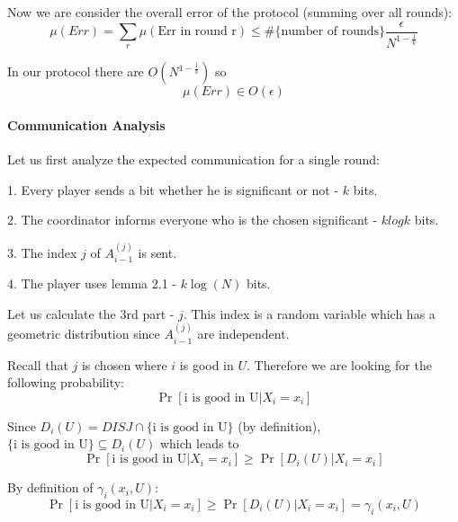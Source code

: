 \documentclass{article}
\theoremstyle{plain}
\begin{document}
Now we are consider the overall error of the protocol (summing over all rounds):
\begin{equation*}
  \mu(Err) = \sum_{r} \mu(\text{Err in round r}) \leq \#\{\text{number of rounds}\} \frac{\epsilon}{N^{1-\frac{1}{k}}}
\end{equation*}

In our protocol there are $O(N^{1-\frac{1}{k}})$ so
\begin{equation*}
  \mu(Err) \in O(\epsilon)
\end{equation*}

\paragraph{Communication Analysis}
Let us first analyze the expected communication for a single round: \newline

1. Every player sends a bit whether he is significant or not - $k$ bits.\newline

2. The coordinator informs everyone who is the chosen significant - $klogk$ bits. \newline

3. The index $j$ of $A_{i-1}^{(j)}$ is sent. \newline

4. The player uses lemma 2.1 - $k\log(N)$ bits. \newline

Let us calculate the 3rd part - $j$. \newline
This index is a random variable which has a geometric distribution since $A_{i-1}^{(j)}$ are independent. \newline

Recall that $j$ is chosen where $i$ is good in $U$. \newline
Therefore we are looking for the following probability:
\begin{equation*}
    \Pr[\text{i is good in U}| X_i = x_i]
\end{equation*}

Since $D_i(U) = DISJ \cap \{\text{i is good in U}\}$ (by definition), $\{\text{i is good in U}\} \subseteq D_i(U)$ which leads to 
\begin{equation*}
    \Pr[\text{i is good in U}| X_i = x_i] \geq \Pr[D_i(U) | X_i = x_i]
\end{equation*}

By definition of $\gamma_i(x_i, U)$:
\begin{equation*}
    \Pr[\text{i is good in U}| X_i = x_i] \geq \Pr[D_i(U) | X_i = x_i] = \gamma_i(x_i, U)
\end{equation*}
\end{document}
